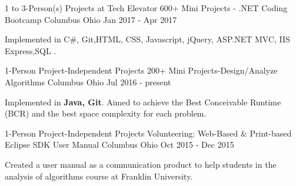 \begin{cventries}
    \vspace{-2mm}   \cventry
    {1 to 3-Person(s) Projects at Tech Elevator}
    {600+ Mini Projects - .NET Coding Bootcamp}
    {Columbus Ohio}
    {Jan 2017 - Apr 2017}
    {
      \begin{cvitems}
        \item {Implemented in C\#, Git,HTML, CSS, Javascript, jQuery, ASP.NET MVC, IIS Express,SQL .}     
      \end{cvitems}   \vspace{-2mm} 
    } 
  \cventry
    {1-Person Project-Independent Projects}
    {200+ Mini Projects-Design/Analyze Algorithms }
    {Columbus Ohio}
    {Jul 2016 - present}
    {
    \begin{cvitems}
        \item {Implemented in \textbf{Java, Git}. Aimed to achieve the Best Conceivable Runtime (BCR) and the best space complexity for each problem.}            
      \end{cvitems}  \vspace{-2mm}     
    } 
     \cventry
    {1-Person Project-Independent Projects}
    {Volunteering: Web-Based \& Print-based Eclipse SDK User Manual }
    {Columbus Ohio}
    {Oct 2015 - Dec 2015}
    {
      \begin{cvitems}
        \item {Created a user manual as a communication product to help students in the analysis of algorithms course at Franklin University. }            
      \end{cvitems}     \vspace{-2mm}      
    } 
\end{cventries}
